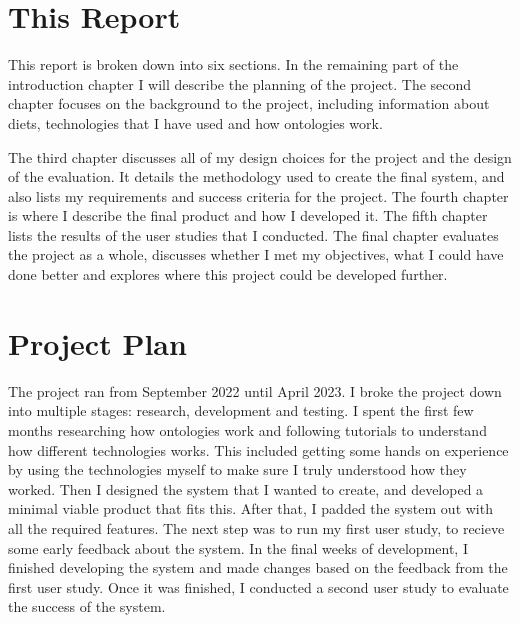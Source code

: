 \section{This Report}

This report is broken down into six sections. In the remaining part of the introduction chapter I will describe the planning of the project. The second chapter focuses on the background to the project, including information about diets, technologies that I have used and how ontologies work.

The third chapter discusses all of my design choices for the project and the design of the evaluation. It details the methodology used to create the final system, and also lists my requirements and success criteria for the project. The fourth chapter is where I describe the final product and how I developed it. The fifth chapter lists the results of the user studies that I conducted. The final chapter evaluates the project as a whole, discusses whether I met my objectives, what I could have done better and explores where this project could be developed further.

\section{Project Plan}

The project ran from September 2022 until April 2023. I broke the project down into multiple stages: research, development and testing. I spent the first few months researching how ontologies work and following tutorials to understand how different technologies works. This included getting some hands on experience by using the technologies myself to make sure I truly understood how they worked. Then I designed the system that I wanted to create, and developed a minimal viable product that fits this. After that, I padded the system out with all the required features. The next step was to run my first user study, to recieve some early feedback about the system. In the final weeks of development, I finished developing the system and made changes based on the feedback from the first user study. Once it was finished, I conducted a second user study to evaluate the success of the system.


